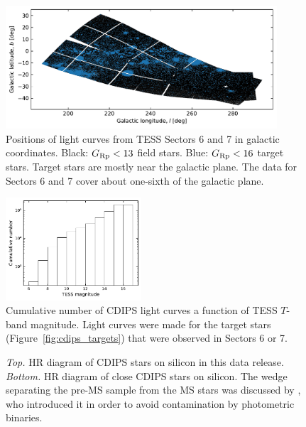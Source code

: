 \documentclass[12pt,twocolumn,tighten,trackchanges]{aastex62}
\begin{document}
\begin{figure}[!t]
	\begin{center}
		\leavevmode
		\includegraphics[width=0.9\textwidth]{galacticcoords_cluster_field_star_positions.pdf}
	\end{center}
	\vspace{-0.7cm}
	\caption{
    Positions of light curves from TESS Sectors 6 and 7 in galactic
    coordinates.  Black: $G_{\rm Rp}<13$ field stars.  Blue: $G_{\rm
    Rp}<16$ target stars.  Target stars are mostly near the galactic
    plane. The data for Sectors 6 and 7 cover about one-sixth of the
    galactic plane.
		\label{fig:lcgalactic}
	}
\end{figure}

\begin{figure}[!t]
	\begin{center}
		\leavevmode
		\includegraphics[width=0.45\textwidth]{cdf_T_mag.pdf}
	\end{center}
	\vspace{-0.5cm}
	\caption{
    Cumulative number of CDIPS light curves a function of TESS
    $T$-band magnitude.  Light curves were made for the target stars
    (Figure~\ref{fig:cdips_targets}) that were observed in Sectors 6
    or 7.
		\label{fig:cdf_T_mag}
	}
\end{figure}

\begin{figure}[!ht]
	\vspace{-1.1cm}
	\vspace{-0.9cm}
	\caption{
    {\it Top.} HR diagram of CDIPS stars on silicon in this data
    release.  {\it Bottom.} HR diagram of close CDIPS stars on
    silicon. The wedge separating the pre-MS sample from the MS stars
    was discussed by \citet{zari_3d_2018}, who introduced it in order
    to avoid contamination by photometric binaries.
	}
	\label{fig:hrd}
\end{figure}
\end{document}
